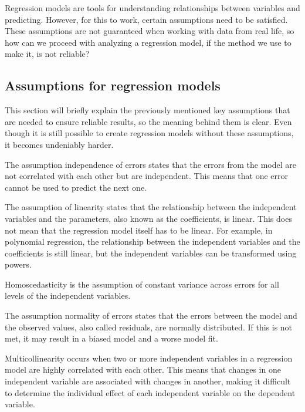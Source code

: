 Regression models are tools for understanding relationships between variables and predicting. However, for this to work, certain assumptions need to be satisfied. 
These assumptions are not guaranteed when working with data from real life, so how can we proceed with analyzing a regression model, if the method we use to make it, is not reliable?


\subsection{Assumptions for regression models}

\noindent This section will briefly explain the previously mentioned key assumptions that are needed to ensure reliable results, so the meaning behind them is clear. Even though it is still possible to create regression models without these assumptions, it becomes undeniably harder.  \newline

\noindent The assumption independence of errors states that the errors from the model are not correlated with each other but are independent. This means that one error cannot be used to predict the next one. \newline


\noindent The assumption of linearity states that the relationship between the independent variables and the parameters, also known as the coefficients, is linear. This does not mean that the regression model itself has to be linear. For example, in polynomial regression, the relationship between the independent variables and the coefficients is still linear, but the independent variables can be transformed using powers.\newline


\noindent Homoscedasticity is the assumption of constant variance across errors for all levels of the independent variables. \newline

\noindent The assumption normality of errors states that the errors between the model and the observed values, also called residuals, are normally distributed. If this is not met, it may result in a biased model and a worse model fit. \newline


\noindent Multicollinearity occurs when two or more independent variables in a regression model are highly correlated with each other. This means that changes in one independent variable are associated with changes in another, making it difficult to determine the individual effect of each independent variable on the dependent variable. \newline

